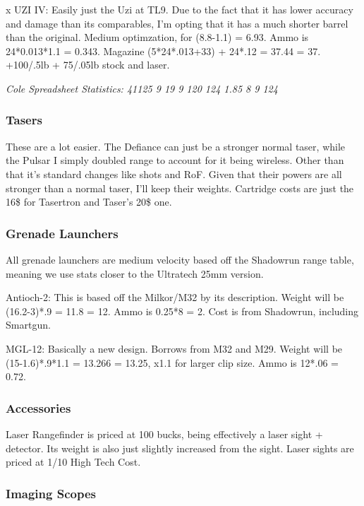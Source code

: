 \begin{multicols*}{2}
	x UZI IV: Easily just the Uzi at TL9. Due to the fact that it has lower accuracy and damage than its comparables, I'm opting that it has a much shorter barrel than the original. Medium optimzation, for (8.8-1.1) = 6.93. Ammo is 24*0.013*1.1 = 0.343. Magazine (5*24*.013+33) + 24*.12 = 37.44 = 37. +100/.5lb + 75/.05lb stock and laser.
	
	\textit{\textcolor{OliveGreen}{Cole Spreadsheet Statistics: 41125 9 19 9 120 124 1.85 8 9 124}}
	
	\subsubsection{Tasers}
	
	These are a lot easier. The Defiance can just be a stronger normal taser, while the Pulsar I simply doubled range to account for it being wireless. Other than that it's standard changes like shots and RoF. Given that their powers are all stronger than a normal taser, I'll keep their weights. Cartridge costs are just the 16\$ for Tasertron and Taser's 20\$ one.
	
	\subsubsection{Grenade Launchers}
	
	All grenade launchers are medium velocity based off the Shadowrun range table, meaning we use stats closer to the Ultratech 25mm version.
	
	Antioch-2: This is based off the Milkor/M32 by its description. Weight will be (16.2-3)*.9 = 11.8 = 12. Ammo is 0.25*8 = 2. Cost is from Shadowrun, including Smartgun.
	
	MGL-12: Basically a new design. Borrows from M32 and M29. Weight will be (15-1.6)*.9*1.1 = 13.266 = 13.25, x1.1 for larger clip size. Ammo is 12*.06 = 0.72.
	
	\subsubsection{Accessories}
	
	Laser Rangefinder is priced at 100 bucks, being effectively a laser sight + detector. Its weight is also just slightly increased from the sight.
	Laser sights are priced at 1/10 High Tech Cost.
	
	
	\subsubsection{Imaging Scopes}
	

\end{multicols*}

